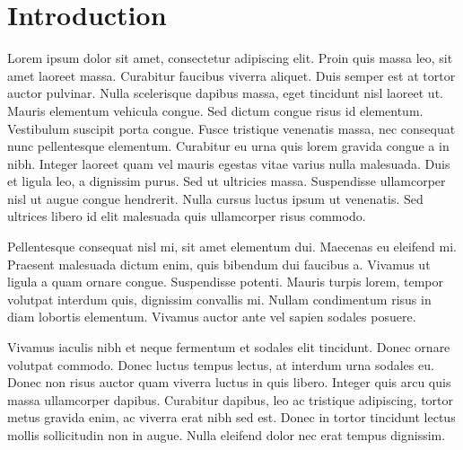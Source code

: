 \chapter*{Introduction}
Lorem ipsum dolor sit amet, consectetur adipiscing elit. 
Proin quis massa leo, sit amet laoreet massa. 
Curabitur faucibus viverra aliquet. 
Duis semper est at tortor auctor pulvinar. 
Nulla scelerisque dapibus massa, eget tincidunt nisl laoreet ut. 
Mauris elementum vehicula congue. Sed dictum congue risus id elementum. 
Vestibulum suscipit porta congue. Fusce tristique venenatis massa, nec consequat nunc pellentesque elementum. 
Curabitur eu urna quis lorem gravida congue a in nibh. 
Integer laoreet quam vel mauris egestas vitae varius nulla malesuada. 
Duis et ligula leo, a dignissim purus. Sed ut ultricies massa. 
Suspendisse ullamcorper nisl ut augue congue hendrerit. 
Nulla cursus luctus ipsum ut venenatis. 
Sed ultrices libero id elit malesuada quis ullamcorper risus commodo.

Pellentesque consequat nisl mi, sit amet elementum dui. Maecenas eu eleifend mi. 
Praesent malesuada dictum enim, quis bibendum dui faucibus a. 
Vivamus ut ligula a quam ornare congue. Suspendisse potenti. 
Mauris turpis lorem, tempor volutpat interdum quis, dignissim convallis mi. 
Nullam condimentum risus in diam lobortis elementum. 
Vivamus auctor ante vel sapien sodales posuere.

Vivamus iaculis nibh et neque fermentum et sodales elit tincidunt. 
Donec ornare volutpat commodo. Donec luctus tempus lectus, at interdum urna sodales eu. 
Donec non risus auctor quam viverra luctus in quis libero. 
Integer quis arcu quis massa ullamcorper dapibus. 
Curabitur dapibus, leo ac tristique adipiscing, tortor metus gravida enim, ac viverra erat nibh sed est. 
Donec in tortor tincidunt lectus mollis sollicitudin non in augue. 
Nulla eleifend dolor nec erat tempus dignissim. 